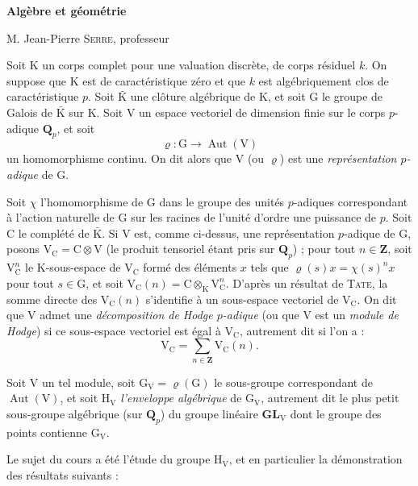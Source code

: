 \begin{center}
\textbf{Algèbre et géométrie}

M. Jean-Pierre \textsc{Serre}, professeur
\end{center}

Soit $\mathrm{K}$ un corps complet pour une valuation discrète, de corps résiduel $k$. On suppose que $\mathrm{K}$ est de caractéristique zéro et que $k$ est algébriquement clos de caractéristique $p$. Soit $\bar{\mathrm{K}}$ une clôture algébrique de $\mathrm{K}$, et soit $\mathrm{G}$ le groupe de Galois de $\bar{\mathrm{K}}$ sur $\mathrm{K}$. Soit $\mathrm{V}$ un espace vectoriel de dimension finie sur le corps $p$-adique $\mathbf{Q}_p$, et soit
\[
\varrho:\mathrm{G}\longrightarrow\operatorname{Aut}(\mathrm{V})
\]
un homomorphisme continu. On dit alors que $\mathrm{V}$ (ou $\varrho$) est une \textit{représentation $p$-adique} de $\mathrm{G}$.

Soit $\chi$ l’homomorphisme de $\mathrm{G}$ dans le groupe des unités $p$-adiques correspondant à l’action naturelle de $\mathrm{G}$ sur les racines de l’unité d’ordre une puissance de $p$. Soit $\mathrm{C}$ le complété de $\bar{\mathrm{K}}$. Si $\mathrm{V}$ est, comme ci-dessus, une représentation $p$-adique de $\mathrm{G}$, posons $\mathrm{V}_{\mathrm{C}}=\mathrm{C}\otimes\mathrm{V}$ (le produit tensoriel étant pris sur $\mathbf{Q}_p$) ; pour tout $n\in\mathbf{Z}$, soit $\mathrm{V}_{\mathrm{C}}^n$ le $\mathrm{K}$-sous-espace de $\mathrm{V}_{\mathrm{C}}$ formé des éléments $x$ tels que $\varrho(s)x=\chi(s)^nx$ pour tout $s\in\mathrm{G}$, et soit $\mathrm{V}_{\mathrm{C}}(n)=\mathrm{C}\otimes_{\mathrm{K}}\mathrm{V}_{\mathrm{C}}^n$. D’après un résultat de \textsc{Tate}, la somme directe des $\mathrm{V}_{\mathrm{C}}(n)$ s’identifie à un sous-espace vectoriel de $\mathrm{V}_{\mathrm{C}}$. On dit que $\mathrm{V}$ admet une \textit{décomposition de Hodge $p$-adique} (ou que $\mathrm{V}$ est un \textit{module de Hodge}) si ce sous-espace vectoriel est égal à $\mathrm{V}_{\mathrm{C}}$, autrement dit si l’on a :
\[
\mathrm{V}_{\mathrm{C}}=\sum_{n\in\mathbf{Z}}\mathrm{V}_{\mathrm{C}}(n).
\]

Soit $\mathrm{V}$ un tel module, soit $\mathrm{G}_{\mathrm{V}}=\varrho(\mathrm{G})$ le sous-groupe correspondant de $\operatorname{Aut}(\mathrm{V})$, et soit $\mathrm{H}_{\mathrm{V}}$ \textit{l’enveloppe algébrique} de $\mathrm{G}_{\mathrm{V}}$, autrement dit le plus petit sous-groupe algébrique (sur $\mathbf{Q}_p$) du groupe linéaire $\mathbf{GL}_{\mathrm{V}}$ dont le groupe des points contienne $\mathrm{G}_{\mathrm{V}}$.

Le sujet du cours a été l’étude du groupe $\mathrm{H}_{\mathrm{V}}$, et en particulier la démonstration des résultats suivants :
